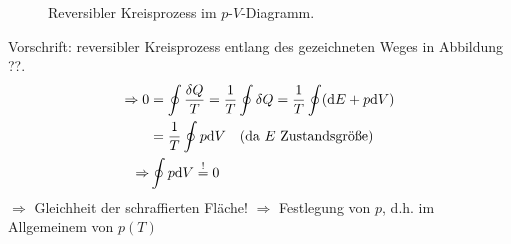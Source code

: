 \begin{figure}[H]
        \centering
        \def\svgwidth{0.5\textwidth}
        
        \caption{Reversibler Kreisprozess im $p$-$V$-Diagramm.}
        \label{img:pV-path}
\end{figure}

Vorschrift: reversibler Kreisprozess entlang des gezeichneten Weges in Abbildung ??.  %
\begin{equation}
    \begin{split}
        \Rightarrow  0 &= \oint \frac{\delta Q}{T} = \frac{1}{T} \oint \delta Q = \frac{1}{T} \oint (\mathrm{d} E + p \mathrm{d} V) \\
        &= \frac{1}{T} \oint p \mathrm{d} V \quad \text{(da $E$ Zustandsgröße)} \\
        \Rightarrow & \oint p \mathrm{d} V \overset{!}{=} 0
    \end{split}
\end{equation}
$\Rightarrow$ Gleichheit der schraffierten Fläche! $\Rightarrow$ Festlegung von $p$, d.h. im Allgemeinem von $p(T)$

